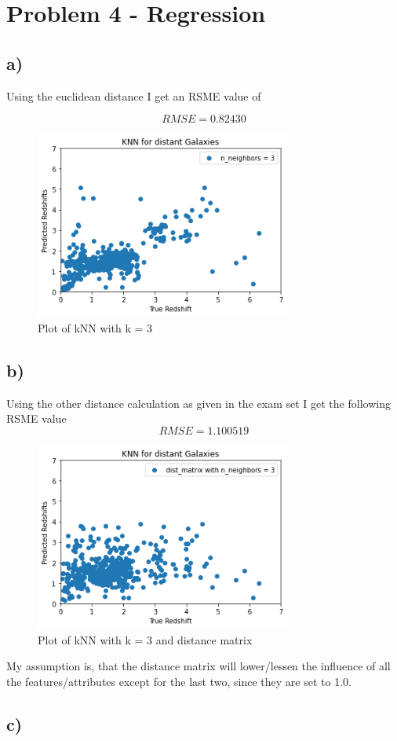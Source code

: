 \section{Problem 4 - Regression}
\subsection{a)}
Using the euclidean distance I get an RSME value of

$$RMSE = 0.82430$$

\begin{figure}[H]
    \centering
    \includegraphics[width=0.75\textwidth]{Figures/Q4_a_galaxiesPlot.png}
    \caption{Plot of kNN with k = 3}
\end{figure}


\subsection{b)}
Using the other distance calculation as given in the exam set I get the following RSME value
$$RMSE = 1.100519$$
\begin{figure}[H]
    \centering
    \includegraphics[width=0.75\textwidth]{Figures/Q4_b_wMatrix_plot.png}
    \caption{Plot of kNN with k = 3 and distance matrix}
\end{figure}

My assumption is, that the distance matrix will lower/lessen the influence of all 
the features/attributes except for the last two, since they are set to 1.0.
\subsection{c)}